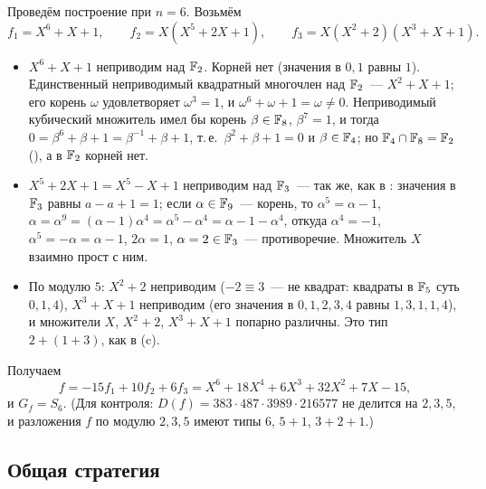 \begin{example}[4.32a]
Проведём построение при $n=6$. Возьмём
\[
f_1=X^6+X+1,\qquad f_2=X(X^5+2X+1),\qquad f_3=X(X^2+2)(X^3+X+1).
\]
\begin{itemize}[leftmargin=*]
\item $X^6+X+1$ неприводим над $\mathbb F_2$. Корней нет (значения в $0,1$ равны $1$). Единственный неприводимый
квадратный многочлен над $\mathbb F_2$~--- $X^2+X+1$; его корень $\omega$ удовлетворяет $\omega^3=1$, и
$\omega^6+\omega+1=\omega\ne0$. Неприводимый кубический множитель имел бы корень $\beta\in\mathbb F_8$, $\beta^7=1$, и тогда
$0=\beta^6+\beta+1=\beta^{-1}+\beta+1$, т.\,е.\ $\beta^2+\beta+1=0$ и $\beta\in\mathbb F_4$; но $\mathbb F_4\cap\mathbb F_8=\mathbb F_2$ (), а
в $\mathbb F_2$ корней нет.
\item $X^5+2X+1=X^5-X+1$ неприводим над $\mathbb F_3$~--- так же, как в : значения в $\mathbb F_3$ равны $a-a+1=1$; если $\alpha\in\mathbb F_9$~---
корень, то $\alpha^5=\alpha-1$, $\alpha=\alpha^9=(\alpha-1)\alpha^4=\alpha^5-\alpha^4=\alpha-1-\alpha^4$, откуда $\alpha^4=-1$,
$\alpha^5=-\alpha=\alpha-1$, $2\alpha=1$, $\alpha=2\in\mathbb F_3$~--- противоречие. Множитель $X$ взаимно прост с ним.
\item По модулю $5$: $X^2+2$ неприводим ($-2\equiv3$~--- не квадрат: квадраты в $\mathbb F_5$ суть $0,1,4$), $X^3+X+1$
неприводим (его значения в $0,1,2,3,4$ равны $1,3,1,1,4$), и множители $X$, $X^2+2$, $X^3+X+1$ попарно различны.
Это тип $2+(1+3)$, как в (c).
\end{itemize}
Получаем
\[
f=-15f_1+10f_2+6f_3=X^6+18X^4+6X^3+32X^2+7X-15,
\]
и $G_f=S_6$. (Для контроля: $D(f)=383\cdot487\cdot3989\cdot216577$ не делится на $2,3,5$, и разложения $f$ по модулю $2,3,5$
имеют типы $6$, $5+1$, $3+2+1$.)
\end{example}

\subsection*{Общая стратегия}

